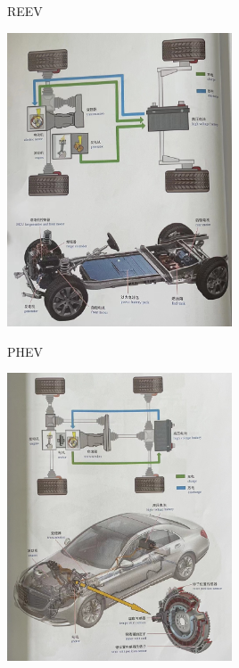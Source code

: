 \begin{frame}
	\begin{block}{}
		\begin{compactitem}
			\item  REEV
				\begin{center}
					\includegraphics[width=0.5\textwidth]{2-42}
				\end{center}
		\end{compactitem}
	\end{block}
\end{frame}
\begin{frame}
	\begin{block}{}
		\begin{compactitem}
			\item  PHEV
			\begin{center}
				\includegraphics[width=0.5\textwidth]{2-43}
			\end{center}
		\end{compactitem}
	\end{block}
\end{frame}
